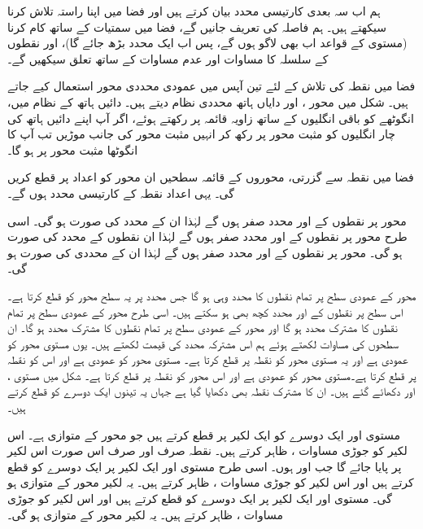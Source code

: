 ہم اب سہ بعدی کارتیسی محدد بیان کرتے ہیں اور فضا میں اپنا راستہ تلاش کرنا سیکھتے ہیں۔ ہم فاصلہ کی تعریف جانیں گے،  فضا میں سمتیات کے ساتھ کام کرنا (مستوی کے قواعد اب بھی لاگو ہوں گے، پس اب ایک محدد بڑھ جائے گا)، اور نقطوں کے سلسلہ کا مساوات اور عدم مساوات کے ساتھ تعلق سیکھیں گے۔

فضا میں نقطہ کی تلاش کے لئے تین آپس میں عمودی محددی محور استعمال کیے جاتے ہیں۔  شکل میں محور ،  اور  دایاں ہاتھ محددی نظام دیتے ہیں۔ دائیں ہاتھ کے نظام میں، انگوٹھے کو باقی انگلیوں کے ساتھ زاویہ قائمہ پر رکھتے ہوئے، اگر آپ اپنے دائیں ہاتھ کی چار انگلیوں کو مثبت  محور پر رکھ کر انہیں مثبت  محور کی جانب موڑیں تب آپ کا انگوٹھا مثبت  محور پر ہو گا۔

فضا میں نقطہ  سے گزرتی، محوروں کے قائمہ سطحیں ان محور کو اعداد   پر قطع کریں گی۔ یہی اعداد نقطہ  کے کارتیسی محدد ہوں گے۔  

محور  پر نقطوں کے  اور  محدد صفر ہوں گے لہٰذا ان کے محدد کی صورت  ہو گی۔ اسی طرح محور  پر نقطوں کے  اور  محدد صفر ہوں گے لہٰذا ان نقطوں کے محدد کی صورت  ہو گی۔ محور  پر نقطوں کے  اور  محدد صفر ہوں گے لہٰذا ان کے محددی کی صورت  ہو گی۔

محور  کے عمودی سطح پر تمام نقطوں کا  محدد وہی ہو گا جس  محدد  پر یہ سطح  محور کو قطع کرتا ہے۔ اس سطح پر نقطوں کے  اور  محدد کچھ بھی ہو سکتے ہیں۔ اسی طرح محور  کے عمودی سطح پر تمام نقطوں کا مشترک  محدد ہو گا اور  محور  کے عمودی سطح پر تمام نقطوں کا مشترک  محدد ہو گا۔ ان سطحوں کی مساوات لکھتے ہوئے ہم اس مشترکہ محدد کی قیمت لکھتے ہیں۔ یوں مستوی  محور  کو عمودی ہے اور یہ مستوی محور  کو نقطہ  پر قطع کرتا ہے۔ مستوی  محور  کو عمودی ہے اور اس کو نقطہ  پر قطع کرتا ہے۔مستوی  محور  کو عمودی ہے اور اس محور کو نقطہ  پر قطع کرتا ہے۔ شکل میں مستوی ،  اور  دکھائے گئے ہیں۔ ان کا مشترک نقطہ بھی دکھایا گیا ہے جہاں یہ تینوں ایک دوسرے کو قطع کرتے ہیں۔

مستوی  اور  ایک دوسرے کو ایک لکیر پر قطع کرتے ہیں جو محور  کے متوازی ہے۔ اس لکیر کو جوڑی مساوات ،  ظاہر کرتے ہیں۔ نقطہ  صرف اور صرف اس صورت اس لکیر پر پایا جائے گا جب  اور  ہوں۔ اسی طرح مستوی  اور  ایک لکیر پر ایک دوسرے کو قطع کرتے ہیں اور اس لکیر کو جوڑی مساوات ،  ظاہر کرتے ہیں۔ یہ لکیر محور  کے متوازی ہو گی۔ مستوی  اور  ایک لکیر پر ایک دوسرے کو قطع کرتے ہیں اور اس لکیر کو جوڑی مساوات ،  ظاہر کرتے ہیں۔ یہ لکیر محور  کے متوازی ہو گی۔

